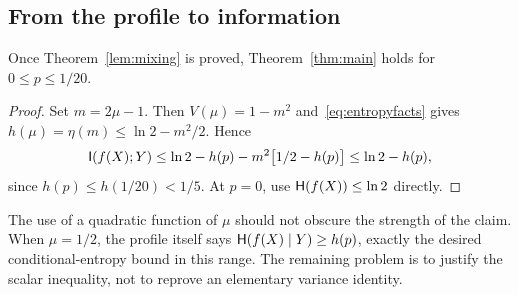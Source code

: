 \subsection{From the profile to information}
\begin{corollary}\label{cor:low}
Once Theorem~\ref{lem:mixing} is proved, Theorem~\ref{thm:main} holds for $0\le p\le1/20$.
\end{corollary}
\begin{proof}
Set $m=2\mu-1$. Then $V(\mu)=1-m^2$ and~\eqref{eq:entropyfacts} gives
$h(\mu)=\eta(m)\le\ln2-m^2/2$. Hence
\[
\mathsf I(f(X);Y)
\le\ln2-h(p)-m^2\bigl[1/2-h(p)\bigr]
\le\ln2-h(p),
\]
since $h(p)\le h(1/20)<1/5$. At $p=0$, use $\mathsf H(f(X))\le\ln2$ directly.
\end{proof}
The use of a quadratic function of $\mu$ should not obscure the strength of the claim. When $\mu=1/2$, the profile itself says $\mathsf H(f(X)\mid Y)\ge h(p)$, exactly the desired conditional-entropy bound in this range. The remaining problem is to justify the scalar inequality, not to reprove an elementary variance identity.

